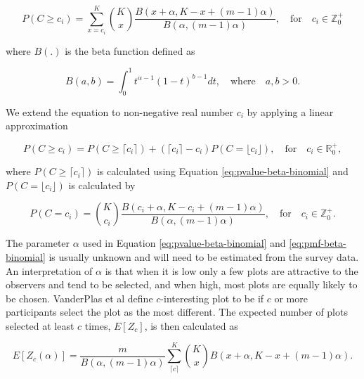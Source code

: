 \documentclass[]{interact}
\theoremstyle{plain}%
\theoremstyle{definition}
\theoremstyle{remark}
\begin{document}
\begin{equation} \label{eq:pvalue-beta-binomial}
P(C \geq c_i) = \sum_{x=c_i}^{K}{K \choose x}\frac{B(x + \alpha, K - x + (m - 1)\alpha)}{B(\alpha, (m-1)\alpha)},\quad \text{for} \quad c_i \in \mathbb{Z}_0^+
\end{equation}

\noindent where \(B(.)\) is the beta function defined as

\begin{equation} \label{eq:betafunction}
B(a, b) = \int_{0}^{1}t^{\alpha - 1}(1-t)^{b-1}dt,\quad \text{where}\quad a,b>0.
\end{equation}

\noindent We extend the equation to non-negative real number \(c_i\) by
applying a linear approximation

\begin{equation} \label{eq:pvalue-beta-binomial-approx}
P(C \geq c_i) = P(C \geq \lceil c_i \rceil) + (\lceil c_i \rceil - c_i) P(C = \lfloor c_i \rfloor), \quad \text{for}\quad c_i \in \mathbb{R}_0^+,
\end{equation}

\noindent where \(P(C \geq \lceil c_i \rceil)\) is calculated using
Equation \ref{eq:pvalue-beta-binomial} and
\(P(C = \lfloor c_i \rfloor)\) is calculated by

\begin{equation} \label{eq:pmf-beta-binomial}
P(C = c_i) = {K \choose c_i}\frac{B(c_i + \alpha, K - c_i + (m - 1)\alpha)}{B(\alpha, (m-1)\alpha)},\quad \text{for} \quad c_i \in \mathbb{Z}_0^+.
\end{equation}

The parameter \(\alpha\) used in Equation \ref{eq:pvalue-beta-binomial}
and \ref{eq:pmf-beta-binomial} is usually unknown and will need to be
estimated from the survey data. An interpretation of \(\alpha\) is that
when it is low only a few plots are attractive to the observers and tend
to be selected, and when high, most plots are equally likely to be
chosen. VanderPlas et al define \(c\)-interesting plot to be if \(c\) or
more participants select the plot as the most different. The expected
number of plots selected at least \(c\) times, \(E[Z_c]\), is then
calculated as

\begin{equation} \label{eq:c-interesting-expectation}
E[Z_c(\alpha)] = \frac{m}{B(\alpha, (m-1)\alpha)}\sum_{\lceil c \rceil}^{K}{K \choose x} B(x + \alpha, K - x + (m-1)\alpha).\end{equation}
\end{document}
